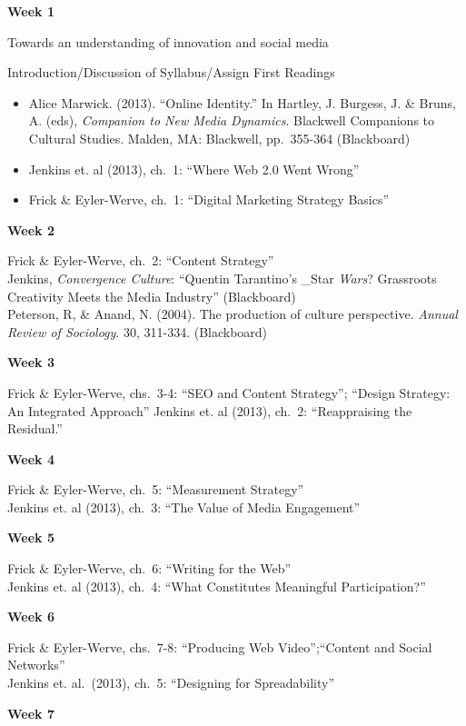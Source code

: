 \documentclass[]{tufte-handout}
\providecommand{\tightlist}{%
  \setlength{\itemsep}{0pt}\setlength{\parskip}{0pt}}
\begin{document}
\textbf{Week 1}

Towards an understanding of innovation and social media

Introduction/Discussion of Syllabus/Assign First Readings

\begin{itemize}
\tightlist
\item
  Alice Marwick. (2013). ``Online Identity.'' In Hartley, J. Burgess, J.
  \& Bruns, A. (eds), \emph{Companion to New Media Dynamics}. Blackwell
  Companions to Cultural Studies. Malden, MA: Blackwell, pp.~355-364
  (Blackboard)\\
\item
  Jenkins et. al (2013), ch.~1: ``Where Web 2.0 Went Wrong''\\
\item
  Frick \& Eyler-Werve, ch.~1: ``Digital Marketing Strategy Basics''
\end{itemize}

\textbf{Week 2}

Frick \& Eyler-Werve, ch.~2: ``Content Strategy''\\
Jenkins, \emph{Convergence Culture}: ``Quentin Tarantino's \_Star
\emph{Wars}? Grassroots Creativity Meets the Media Industry''
(Blackboard)\\
Peterson, R, \& Anand, N. (2004). The production of culture perspective.
\emph{Annual Review of Sociology}. 30, 311-334. (Blackboard)

\textbf{Week 3}

Frick \& Eyler-Werve, chs.~3-4: ``SEO and Content Strategy''; ``Design
Strategy: An Integrated Approach'' Jenkins et. al (2013), ch.~2:
``Reappraising the Residual.''

\textbf{Week 4}

Frick \& Eyler-Werve, ch.~5: ``Measurement Strategy''\\
Jenkins et. al (2013), ch.~3: ``The Value of Media Engagement''

\textbf{Week 5}

Frick \& Eyler-Werve, ch.~6: ``Writing for the Web''\\
Jenkins et. al (2013), ch.~4: ``What Constitutes Meaningful
Participation?''

\textbf{Week 6}

Frick \& Eyler-Werve, chs.~7-8: ``Producing Web Video'';``Content and
Social Networks''\\
Jenkins et. al.~(2013), ch.~5: ``Designing for Spreadability''

\textbf{Week 7}
\end{document}
